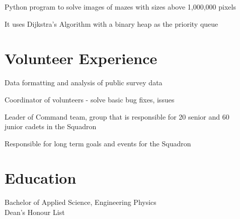 \documentclass[]{deedy-resume-openfont}
\begin{document}
\begin{tightemize}
\item Python program to solve images of mazes with sizes above 1,000,000 pixels
\item It uses Dijkstra’s Algorithm with a binary heap as the priority queue
\end{tightemize}
\sectionsep


\section{Volunteer Experience}
\begin{tightemize}
\item Data formatting and analysis of public survey data
\item Coordinator of volunteers - solve basic bug fixes, issues
\end{tightemize}
\sectionsep

\begin{tightemize}
\item Leader of Command team, group that is responsible for 20 senior and 60 \\  junior cadets in the Squadron 
\item Responsible for long term goals and events for the Squadron
\end{tightemize}
\sectionsep

\section{Education}
Bachelor of Applied Science, Engineering Physics \\
Dean's Honour List
\sectionsep
\end{document}

